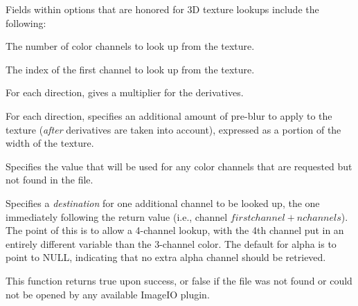 Fields within {\cf options} that are honored for 3D texture lookups
include the following:

\vspace{-12pt}
\vspace{10pt}
The number of color channels to look up from the texture.
\apiend

\vspace{-24pt}
\vspace{10pt}
The index of the first channel to look up from the texture.
\apiend

\vspace{-24pt}
\vspace{10pt}
For each direction, gives a multiplier for the derivatives.
\apiend

\vspace{-24pt}
\vspace{10pt}
For each direction, specifies an additional amount of pre-blur to apply
to the texture (\emph{after} derivatives are taken into account),
expressed as a portion of the width of the texture.
\apiend

\vspace{-24pt}
\vspace{10pt}
Specifies the value that will be used for any color channels that are
requested but not found in the file.
\apiend

\vspace{-24pt}
\vspace{10pt}
Specifies a \emph{destination} for one additional channel to be looked
up, the one immediately following the return value (i.e., channel
$\mathit{firstchannel}+\mathit{nchannels}$).  The point of this is to
allow a 4-channel lookup, with the 4th channel put in an entirely
different variable than the 3-channel color.  The default for {\cf
  alpha} is to point to NULL, indicating that no extra alpha channel
should be retrieved.
\apiend

This function returns {\cf true} upon success, or {\cf false} if the
file was not found or could not be opened by any available ImageIO
plugin.
\apiend


